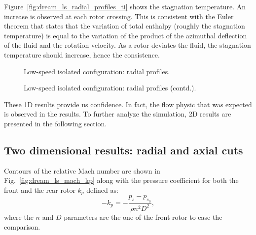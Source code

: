 Figure~\ref{fig:dream_ls_radial_profiles_ti}
shows the stagnation temperature.
An increase is observed at each 
rotor crossing. This is consistent with the
Euler theorem that states that the variation of total enthalpy (roughly
the stagnation temperature) is equal to the variation of the product of
the azimuthal deflection of the fluid and the rotation velocity. As a rotor
deviates the fluid, the stagnation temperature should increase, 
hence the consistence.
\begin{figure}[htp]
  \centering
  \caption{Low-speed isolated configuration: radial profiles.}
\end{figure}
\begin{figure}[htp]
  \centering
  \setcounter{subfigure}{3}
  \caption{Low-speed isolated configuration: radial profiles (contd.).}
  \label{fig:dream_ls_radial_profiles}
\end{figure}

These 1D results provide us confidence. In fact, the flow physic that
was expected is observed in the results. To further analyze the simulation,
2D results are presented in the following section.

\subsection{Two dimensional results: radial and axial cuts}
\label{sub:dream_ls_flow_field}

Contours of the relative Mach number are shown in 
Fig.~\ref{fig:dream_ls_mach_kp} along with the pressure coefficient
for both the front and the rear rotor
$k_p$ defined as:
\begin{equation}
   -k_p = - \frac{p_s - p_{s_0}}{\rho n^2 D^2},
\end{equation}
where the $n$ and $D$ parameters are the one of the front rotor
to ease the comparison.


